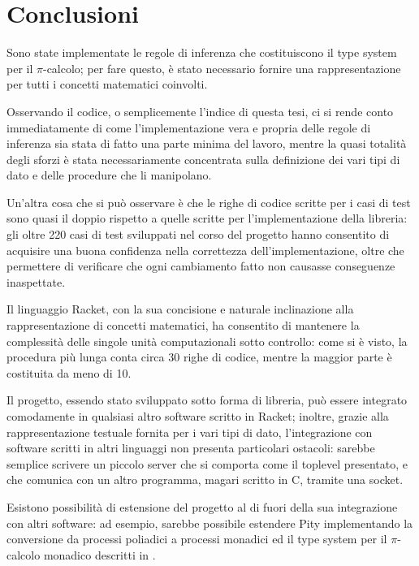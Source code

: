 \chapter{Conclusioni}

Sono state implementate le regole di inferenza che costituiscono il
type system per il $\pi$-calcolo; per fare questo, \`e stato necessario
fornire una rappresentazione per tutti i concetti matematici coinvolti.

Osservando il codice, o semplicemente l'indice di questa tesi, ci si
rende conto immediatamente di come l'implementazione vera e propria
delle regole di inferenza sia stata di fatto una parte minima del lavoro,
mentre la quasi totalit\`a degli sforzi \`e stata necessariamente
concentrata sulla definizione dei vari tipi di dato e delle procedure
che li manipolano.

Un'altra cosa che si pu\`o osservare \`e che le righe di codice scritte
per i casi di test sono quasi il doppio rispetto a quelle scritte per
l'implementazione della libreria: gli oltre 220 casi di test sviluppati
nel corso del progetto hanno consentito di acquisire una buona confidenza
nella correttezza dell'implementazione, oltre che permettere di
verificare che ogni cambiamento fatto non causasse conseguenze
inaspettate.

Il linguaggio Racket, con la sua concisione e naturale inclinazione alla
rappresentazione di concetti matematici, ha consentito di mantenere la
complessit\`a delle singole unit\`a computazionali sotto controllo: come
si \`e visto, la procedura pi\`u lunga conta circa 30 righe di codice,
mentre la maggior parte \`e costituita da meno di 10.

Il progetto, essendo stato sviluppato sotto forma di libreria, pu\`o
essere integrato comodamente in qualsiasi altro software scritto in
Racket; inoltre, grazie alla rappresentazione testuale fornita per i
vari tipi di dato, l'integrazione con software scritti in altri linguaggi
non presenta particolari ostacoli: sarebbe semplice scrivere un piccolo
server che si comporta come il toplevel presentato, e che comunica con
un altro programma, magari scritto in C, tramite una socket.

Esistono possibilit\`a di estensione del progetto al di fuori della sua
integrazione con altri software: ad esempio, sarebbe possibile
estendere Pity implementando la conversione da processi poliadici a
processi monadici ed il type system per il $\pi$-calcolo monadico
descritti in \cite{qw05}.
